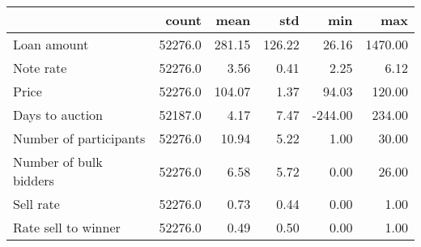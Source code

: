 \begin{tabular}{lrrrrr}
\toprule
{} &    count &    mean &     std &     min &      max \\
\midrule
Loan amount            &  52276.0 &  281.15 &  126.22 &   26.16 &  1470.00 \\
Note rate              &  52276.0 &    3.56 &    0.41 &    2.25 &     6.12 \\
Price                  &  52276.0 &  104.07 &    1.37 &   94.03 &   120.00 \\
Days to auction        &  52187.0 &    4.17 &    7.47 & -244.00 &   234.00 \\
Number of participants &  52276.0 &   10.94 &    5.22 &    1.00 &    30.00 \\
Number of bulk bidders &  52276.0 &    6.58 &    5.72 &    0.00 &    26.00 \\
Sell rate              &  52276.0 &    0.73 &    0.44 &    0.00 &     1.00 \\
Rate sell to winner    &  52276.0 &    0.49 &    0.50 &    0.00 &     1.00 \\
\bottomrule
\end{tabular}
